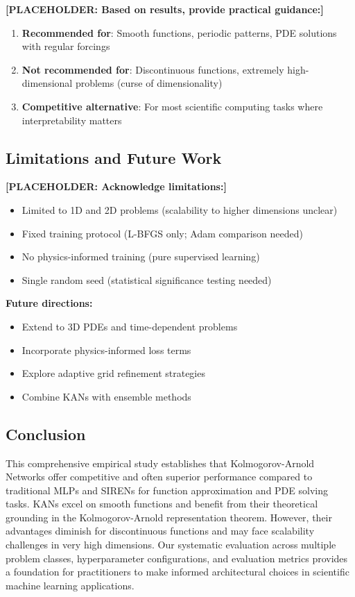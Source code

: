\documentclass[11pt,a4paper]{article}
\begin{document}
\textbf{[PLACEHOLDER: Based on results, provide practical guidance:]}
\begin{enumerate}
    \item \textbf{Recommended for}: Smooth functions, periodic patterns, PDE solutions with regular forcings
    \item \textbf{Not recommended for}: Discontinuous functions, extremely high-dimensional problems (curse of dimensionality)
    \item \textbf{Competitive alternative}: For most scientific computing tasks where interpretability matters
\end{enumerate}

\subsection{Limitations and Future Work}

\textbf{[PLACEHOLDER: Acknowledge limitations:]}
\begin{itemize}
    \item Limited to 1D and 2D problems (scalability to higher dimensions unclear)
    \item Fixed training protocol (L-BFGS only; Adam comparison needed)
    \item No physics-informed training (pure supervised learning)
    \item Single random seed (statistical significance testing needed)
\end{itemize}

\textbf{Future directions:}
\begin{itemize}
    \item Extend to 3D PDEs and time-dependent problems
    \item Incorporate physics-informed loss terms
    \item Explore adaptive grid refinement strategies
    \item Combine KANs with ensemble methods
\end{itemize}

\subsection{Conclusion}

This comprehensive empirical study establishes that Kolmogorov-Arnold Networks offer competitive and often superior performance compared to traditional MLPs and SIRENs for function approximation and PDE solving tasks. KANs excel on smooth functions and benefit from their theoretical grounding in the Kolmogorov-Arnold representation theorem. However, their advantages diminish for discontinuous functions and may face scalability challenges in very high dimensions. Our systematic evaluation across multiple problem classes, hyperparameter configurations, and evaluation metrics provides a foundation for practitioners to make informed architectural choices in scientific machine learning applications.
\end{document}
